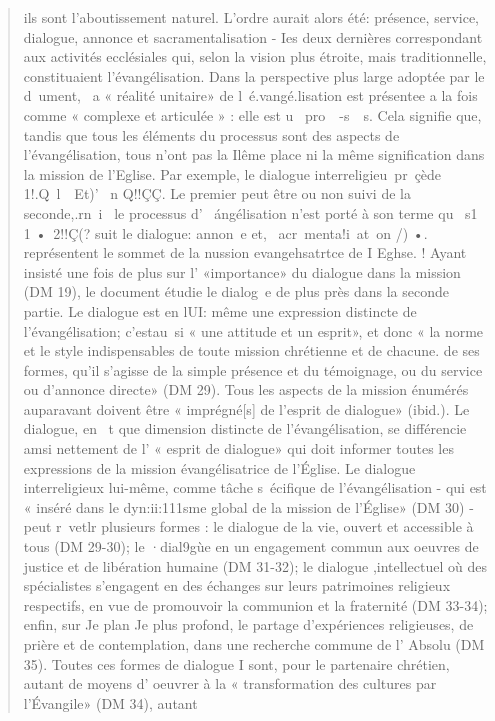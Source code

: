 \begin{quote}
ils sont l'aboutissement naturel. L'ordre aurait alors été: présence,
service, dialogue, annonce et sacramentalisation - Ies
deux dernières correspondant aux activités ecclésiales qui,
selon la vision plus étroite, mais traditionnelle, constituaient
l'évangélisation.
Dans la perspective plus large adoptée par le d~ument, ~a
« réalité unitaire» de l~é.vangé.lisation est présentee a la fois
comme « complexe et articulée » : elle est u~ pro~~-s~~s. Cela
signifie que, tandis que tous les éléments du processus sont
des aspects de l'évangélisation, tous n'ont pas la Ilême place
ni la même signification dans la mission de l'Eglise. Par
exemple, le dialogue interreligieu~pr~çède 1!.Q~l~~Et)' ~n
Q!!ÇÇ. Le premier peut être ou non suivi de la seconde,.rn~i~
le processus d' ~\'angélisation n'est porté à son terme qu~ s1
1 •~2!!Ç(? suit le dialogue: annon~e et, ~acr~menta!i~at~on /) •.
représentent le sommet de la nussion evangehsatrtce de I Eghse. !
Ayant insisté une fois de plus sur l' «importance» du dialogue
dans la mission (DM 19), le document étudie le dialog~e
de plus près dans la seconde partie. Le dialogue est en lUI:
même une expression distincte de l'évangélisation; c'estau~si
« une attitude et un esprit», et donc « la norme et le style indispensables
de toute mission chrétienne et de chacune. de ses
formes, qu'il s'agisse de la simple présence et du témoignage,
ou du service ou d'annonce directe» (DM 29). Tous les aspects
de la mission énumérés auparavant doivent être « imprégné[s]
de l'esprit de dialogue» (ibid.). Le dialogue, en ~t que dimension
distincte de l'évangélisation, se différencie amsi nettement
de l' « esprit de dialogue» qui doit informer toutes les
expressions de la mission évangélisatrice de l'Église.
Le dialogue interreligieux lui-même, comme tâche s~écifique
de l'évangélisation - qui est « inséré dans le dyn:ii:111sme
global de la mission de l'Église» (DM 30) - peut r~vetlr plusieurs
formes : le dialogue de la vie, ouvert et accessible à tous
(DM 29-30); le ·dial9gùe en un engagement commun aux
oeuvres de justice et de libération humaine (DM 31-32); le
dialogue ,intellectuel où des spécialistes s'engagent en des
échanges sur leurs patrimoines religieux respectifs, en vue de
promouvoir la communion et la fraternité (DM 33-34); enfin,
sur Je plan Je plus profond, le partage d'expériences religieuses,
de prière et de contemplation, dans une recherche commune
de l' Absolu (DM 35). Toutes ces formes de dialogue I sont,
pour le partenaire chrétien, autant de moyens d' oeuvrer à la
« transformation des cultures par l'Évangile» (DM 34), autant

\end{quote}
